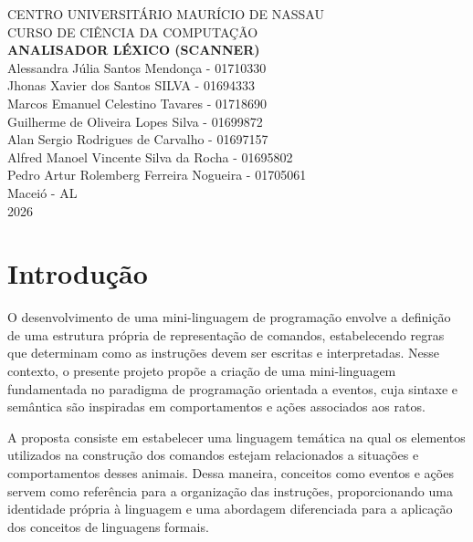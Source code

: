 \documentclass[12pt,a4paper]{article}
\begin{document}
\hypersetup{pageanchor=false}

\begin{titlepage}
\centering

{\large CENTRO UNIVERSITÁRIO MAURÍCIO DE NASSAU}\\[1cm]

{\large CURSO DE CIÊNCIA DA COMPUTAÇÃO}\\[3cm]

{\Large\textbf{ANALISADOR LÉXICO (SCANNER)}}\\[2cm]

Alessandra Júlia Santos Mendonça - 01710330\\
Jhonas Xavier dos Santos SILVA - 01694333\\
Marcos Emanuel Celestino Tavares - 01718690\\
Guilherme de Oliveira Lopes Silva - 01699872\\
Alan Sergio Rodrigues de Carvalho - 01697157\\
Alfred Manoel Vincente Silva da Rocha - 01695802\\
Pedro Artur Rolemberg Ferreira Nogueira - 01705061\\

\vfill
{\large Maceió - AL}\\
{\large 2026}

\end{titlepage}

\hypersetup{pageanchor=true}

\tableofcontents
\clearpage
{}


\section{Introdução}

O desenvolvimento de uma mini-linguagem de programação envolve a definição de uma estrutura própria de representação de comandos, estabelecendo regras que determinam como as instruções devem ser escritas e interpretadas. Nesse contexto, o presente projeto propõe a criação de uma mini-linguagem fundamentada no paradigma de programação orientada a eventos, cuja sintaxe e semântica são inspiradas em comportamentos e ações associados aos ratos.

A proposta consiste em estabelecer uma linguagem temática na qual os elementos utilizados na construção dos comandos estejam relacionados a situações e comportamentos desses animais. Dessa maneira, conceitos como eventos e ações servem como referência para a organização das instruções, proporcionando uma identidade própria à linguagem e uma abordagem diferenciada para a aplicação dos conceitos de linguagens formais.
\end{document}

